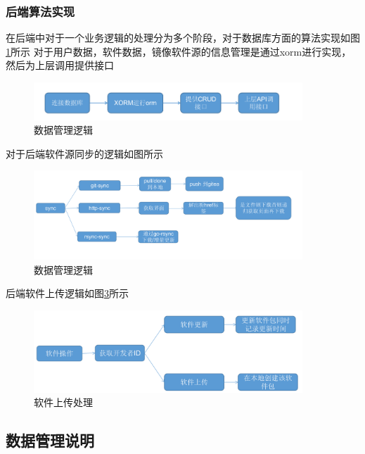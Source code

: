 \documentclass[supercite]{Experimental_Report}
\theoremstyle{definition}
\begin{document}
\subsubsection{后端算法实现}
在后端中对于一个业务逻辑的处理分为多个阶段，对于数据库方面的算法实现如图\ref{curd}所示
对于用户数据，软件数据，镜像软件源的信息管理是通过xorm进行实现，然后为上层调用提供接口

\begin{figure}[!h]
    \centering
    \includegraphics[width=0.9\textwidth]{./images/crud.png}
    \caption{数据管理逻辑}
    \label{curd}
\end{figure}

对于后端软件源同步的逻辑如图所示

\begin{figure}[!h]
    \centering
    \includegraphics[width=0.9\textwidth]{./images/sync_s.png}
    \caption{数据管理逻辑}
    \label{sync_s}
\end{figure}

后端软件上传逻辑如图\ref{soft}所示
\begin{figure}[!h]
    \centering
    \includegraphics[width=0.9\textwidth]{./images/soft.png}
    \caption{软件上传处理}
    \label{soft}
\end{figure}

\subsection{数据管理说明}
\end{document}
